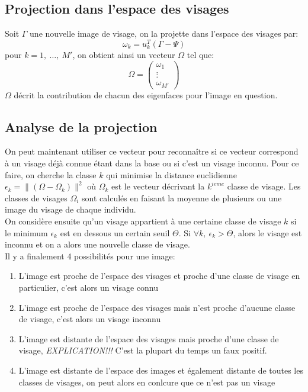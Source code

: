 \documentclass[12pt,french]{article}
\begin{document}
\subsection{Projection dans l'espace des visages}
Soit $\Gamma$ une nouvelle image de visage, on la projette dans l'espace des visages par:
$$\omega_k = u_k^T(\Gamma - \Psi)$$
pour $k = 1,~\dots,~M'$, on obtient ainsi un vecteur $\Omega$ tel que:
\[\Omega =
  \begin{pmatrix}
    \omega_1 \\
    \vdots \\
    \omega_{M'}
  \end{pmatrix}
\]
$\Omega$ décrit la contribution de chacun des eigenfaces pour l'image en question.

\subsection{Analyse de la projection}
On peut maintenant utiliser ce vecteur pour reconnaître si ce vecteur correspond à un visage déjà connue étant dans la base ou si c'est un visage inconnu.
Pour ce faire, on cherche la classe $k$ qui minimise la distance euclidienne $\epsilon_k = \|(\Omega - \Omega_k)\|^2$
où $\Omega_k$ est le vecteur décrivant la $k^{ieme}$ classe de visage. Les classes de visages $\Omega_i$ sont calculés en faisant la moyenne de plusieurs ou une image du visage de chaque individu. \\
On considère ensuite qu'un visage appartient à une certaine classe de visage $k$ si le minimum $\epsilon_k$ est en dessous un certain seuil $\Theta$.
Si $\forall k,~\epsilon_k > \Theta$, alors le visage est inconnu et on a alors une nouvelle classe de visage. \\
Il y a finalement 4 possibilités pour une image:
\begin{enumerate}
\item L'image est proche de l'espace des visages et proche d'une classe de visage en particulier, c'est alors un visage connu
\item L'image est proche de l'espace des visages mais n'est proche d'aucune classe de visage, c'est alors un visage inconnu
\item L'image est distante de l'espace des visages mais proche d'une classe de visage, \emph{EXPLICATION!!!} C'est la plupart du temps un faux positif.
\item L'image est distante de l'espace des images et également distante de toutes les classes de visages, on peut alors en conlcure que ce n'est pas un visage
\end{enumerate}
\end{document}
